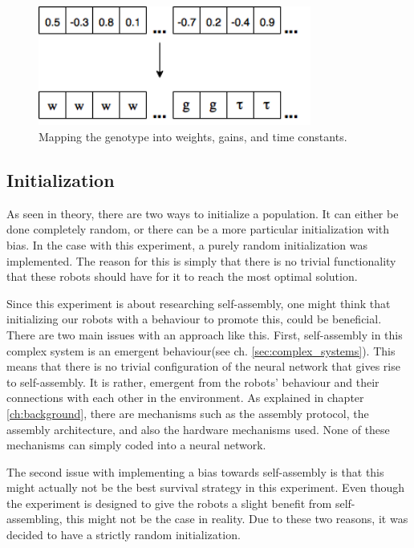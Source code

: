 \begin{figure}[H]		
	\centering
	\includegraphics[width=0.80\textwidth, clip]{chapters/res/genotype_translation.png}
	\caption{Mapping the genotype into weights, gains, and time constants.}
	\label{fig:genotype-mapping}
\end{figure}

\subsection{Initialization}
As seen in theory, there are two ways to initialize a population. 
It can either be done completely random, or there can be a more particular initialization with bias. 
In the case with this experiment, a purely random initialization was implemented.
The reason for this is simply that there is no trivial functionality that these robots should have for it to reach the most optimal solution.

Since this experiment is about researching self-assembly, one might think that initializing our robots with a behaviour to promote this, could be beneficial.
There are two main issues with an approach like this.
First, self-assembly in this complex system is an emergent behaviour(see ch. \ref{sec:complex_systems}).
This means that there is no trivial configuration of the neural network that gives rise to self-assembly.
It is rather, emergent from the robots' behaviour and their connections with each other in the environment.
As explained in chapter \ref{ch:background}, there are mechanisms such as the assembly protocol, the assembly architecture, and also the hardware mechanisms used.
None of these mechanisms can simply coded into a neural network.

The second issue with implementing a bias towards self-assembly is that this might actually not be the best survival strategy in this experiment.
Even though the experiment is designed to give the robots a slight benefit from self-assembling, this might not be the case in reality.
Due to these two reasons, it was decided to have a strictly random initialization.

